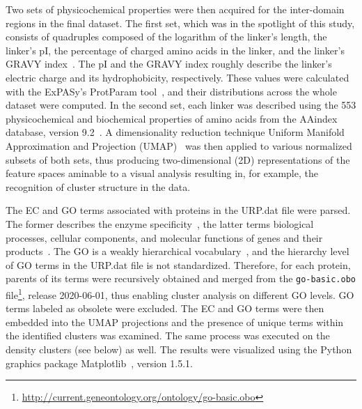 Two sets of physicochemical properties were then acquired for the inter-domain regions in
the final dataset.
The first set, which was in the spotlight of this study, consists of quadruples composed
of the logarithm of the linker's length, the linker's pI, the percentage
of charged amino acids in the linker, and the linker's GRAVY index~\cite{kyte1982simple}.
The pI and the GRAVY index roughly describe the linker's electric charge and its
hydrophobicity, respectively.
These values were calculated with the ExPASy's ProtParam tool~\cite{gasteiger2005protein},
and their distributions across the whole dataset were computed.
In the second set, each linker was described using the 553 physicochemical and
biochemical properties of amino acids from the AAindex database, version
9.2~\cite{nakai1988cluster, tomii1996analysis, kawashima1999aaindex, kawashima2000aaindex,
kawashima2007aaindex}.
A dimensionality reduction technique Uniform Manifold Approximation and Projection
(UMAP)~\cite{mcinnes2018umap} was then applied to various normalized subsets of both
sets, thus producing two-dimensional (2D) representations of the feature spaces aminable
to a visual analysis resulting in, for example, the recognition of cluster structure in
the data.

The EC and GO terms associated with proteins in the URP.dat file were parsed.
The former describes the enzyme specificity~\cite{webb1992enzyme}, the latter terms
biological processes, cellular components, and molecular functions of genes and their
products~\cite{ashburner2000gene, gene2019gene}.
The GO is a weakly hierarchical vocabulary~\cite{ashburner2000gene}, and the hierarchy
level of GO terms in the URP.dat file is not standardized.
Therefore, for each protein, parents of its terms were recursively obtained and merged
from the \texttt{go-basic.obo}
file\footnote{\url{http://current.geneontology.org/ontology/go-basic.obo}}, release
2020-06-01, thus enabling cluster analysis on different GO levels.
GO terms labeled as obsolete were excluded.
The EC and GO terms were then embedded into the UMAP projections and the presence of
unique terms within the identified clusters was examined.
The same process was executed on the density clusters (see below) as well.
The results were visualized using the Python graphics package
Matplotlib~\cite{hunter2007matplotlib}, version 1.5.1.
